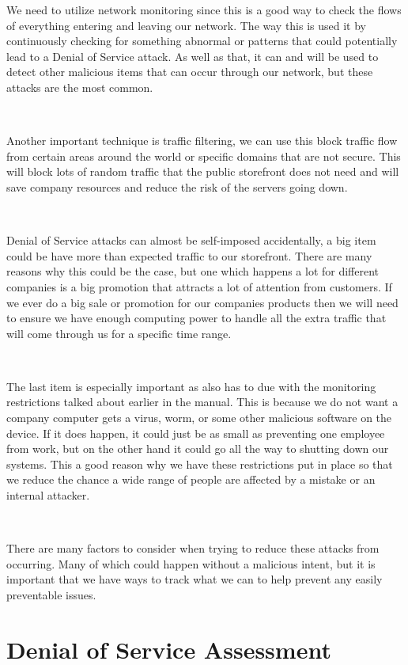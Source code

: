 \documentclass[12pt,a4paper]{report}
\begin{document}
We need to utilize network monitoring since this is a good way to check the flows of everything entering and leaving our network.
The way this is used it by continuously checking for something abnormal or patterns that could potentially lead to a Denial of Service attack.
As well as that, it can and will be used to detect other malicious items that can occur through our network, but these attacks are the most common.

\

Another important technique is traffic filtering, we can use this block traffic flow from certain areas around the world or specific domains that are not secure.
This will block lots of random traffic that the public storefront does not need and will save company resources and reduce the risk of the servers going down.

\

Denial of Service attacks can almost be self-imposed accidentally, a big item could be have more than expected traffic to our storefront.
There are many reasons why this could be the case, but one which happens a lot for different companies is a big promotion that attracts a lot of attention from customers.
If we ever do a big sale or promotion for our companies products then we will need to ensure we have enough computing power to handle all the extra traffic that will come through us for a specific time range.

\

The last item is especially important as also has to due with the monitoring restrictions talked about earlier in the manual.
This is because we do not want a company computer gets a virus, worm, or some other malicious software on the device.
If it does happen, it could just be as small as preventing one employee from work, but on the other hand it could go all the way to shutting down our systems.
This a good reason why we have these restrictions put in place so that we reduce the chance a wide range of people are affected by a mistake or an internal attacker.

\

There are many factors to consider when trying to reduce these attacks from occurring.
Many of which could happen without a malicious intent, but it is important that we have ways to track what we can to help prevent any easily preventable issues.

\section{Denial of Service Assessment}
\end{document}
